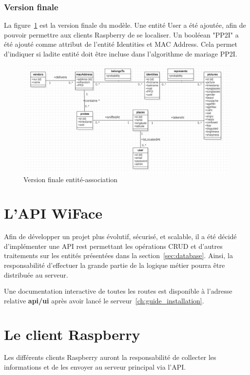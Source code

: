\subsubsection{Version finale}

La figure~\ref{fig:model-ea-5} est la version finale du modèle. 
Une entité User a été ajoutée, afin de pouvoir permettre aux clients Raspberry de se localiser.
Un booléean "PP2I" a été ajouté comme attribut de l'entité Identities et MAC Address. Cela permet
d'indiquer si ladite entité doit être incluse dans l'algorithme de mariage PP2I. 

\begin{figure}[H]
	\centering
	\includegraphics[width=12cm]{images/database_finale.png}
	\caption{Version finale entité-association}
	\label{fig:model-ea-5}
\end{figure}

\section{L'API WiFace}

Afin de développer un projet plus évolutif, sécurisé, et scalable, il a été décidé d'implémenter une API rest permettant les opérations CRUD et d'autres
traitements sur les entités présentées dans la section~\ref{sec:database}.\cite{FLASKREST}
Ainsi, la responsabilité d’effectuer la grande partie de la logique métier pourra
être distribuée au serveur.

Une documentation interactive de toutes les routes est disponible à l'adresse relative \textbf{api/ui} après avoir lancé le serveur~\ref{ch:guide_installation}. 
\section{Le client Raspberry}
Les différents clients Raspberry auront la responsabilité de collecter les informations et de les envoyer
au serveur principal via l'API. 

